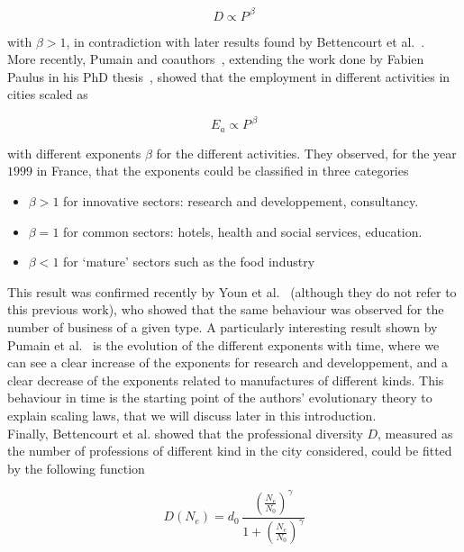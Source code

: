\begin{equation}
    D \propto P^{\, \beta}
\end{equation}

with $\beta > 1$, in contradiction with later results found by Bettencourt et
al.~\cite{Bettencourt:2014}.\\

More recently, Pumain and coauthors~\cite{Pumain:2006}, extending the work done
by Fabien Paulus in his PhD thesis~\cite{Paulus:2004}, showed that the
employment in different activities in cities scaled as

\begin{equation}
    E_a \propto P^{\,\beta}
\end{equation}

with different exponents $\beta$ for the different activities. They observed,
for the year $1999$ in France, that the exponents could be classified in three
categories

\begin{itemize}
    \item $\beta > 1$ for innovative sectors: research and developpement,
        consultancy.
    \item $\beta = 1$ for common sectors: hotels, health and social services,
        education.
    \item $\beta < 1$ for `mature' sectors such as the food industry
\end{itemize}

This result was confirmed recently by Youn et al.~\cite{Youn:2014} (although
they do not refer to this previous work), who showed that the same behaviour was
observed for the number of business of a given type. A particularly interesting
result shown by Pumain et al.~\cite{Pumain:2006} is the evolution of the
different exponents with time, where we can see a clear increase of the
exponents for research and developpement, and a clear decrease of the exponents
related to manufactures of different kinds. This behaviour in time is the
starting point of the authors' evolutionary theory to explain scaling laws, that
we will discuss later in this introduction.\\

Finally, Bettencourt et al.\cite{Bettencourt:2014} showed that the professional
diversity $D$, measured as the number of professions of different kind in the
city considered, could be fitted by the following function

\begin{equation}
    D(N_e) = d_0\, \frac{\left(\frac{N_e}{N_0}\right)^\gamma}{1+\left(\frac{N_e}{N_0}\right)^\gamma}
\end{equation}

